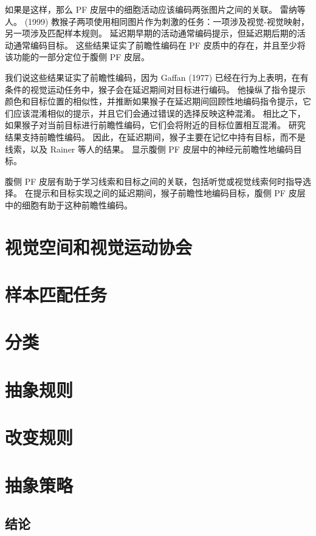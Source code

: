 如果是这样，那么 PF 皮层中的细胞活动应该编码两张图片之间的关联。 雷纳等人。 (1999) 教猴子两项使用相同图片作为刺激的任务：一项涉及视觉-视觉映射，另一项涉及匹配样本规则。 延迟期早期的活动通常编码提示，但延迟期后期的活动通常编码目标。 这些结果证实了前瞻性编码在 PF 皮质中的存在，并且至少将该功能的一部分定位于腹侧 PF 皮层。
\par
我们说这些结果证实了前瞻性编码，因为 Gaffan (1977) 已经在行为上表明，在有条件的视觉运动任务中，猴子会在延迟期间对目标进行编码。 他操纵了指令提示颜色和目标位置的相似性，并推断如果猴子在延迟期间回顾性地编码指令提示，它们应该混淆相似的提示，并且它们会通过错误的选择反映这种混淆。 相比之下，如果猴子对当前目标进行前瞻性编码，它们会将附近的目标位置相互混淆。 研究结果支持前瞻性编码。 因此，在延迟期间，猴子主要在记忆中持有目标，而不是线索，以及 Rainer 等人的结果。 显示腹侧 PF 皮层中的神经元前瞻性地编码目标。
\begin{enumerate}
\par
腹侧 PF 皮层有助于学习线索和目标之间的关联，包括听觉或视觉线索何时指导选择。 在提示和目标实现之间的延迟期间，猴子前瞻性地编码目标，腹侧 PF 皮层中的细胞有助于这种前瞻性编码。
\end{enumerate}
\section{视觉空间和视觉运动协会}

\section{样本匹配任务}

\section{分类}

\section{抽象规则}

\section{改变规则}

\section{抽象策略}

\subsection{结论}


